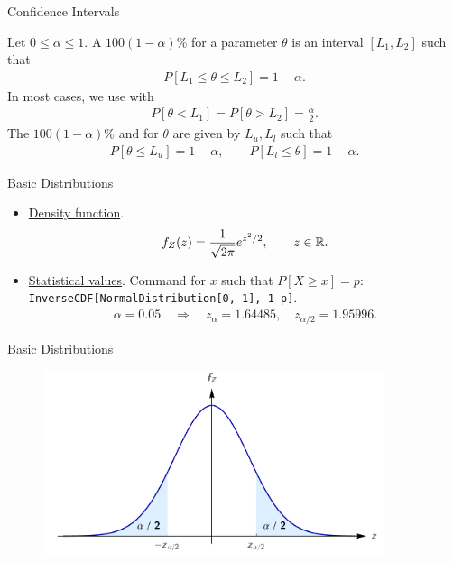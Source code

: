 \begin{frame}{Confidence Intervals}

\justifying
{} Let $0\leq \alpha \leq 1$. A $100(1-\alpha)\%$  for a parameter $\theta$ is an interval $[L_1, L_2]$ such that
\begin{align*}
P[L_1\leq \theta\leq L_2] = 1 - \alpha.
\end{align*}
In most cases, we use  with
\begin{align*}
P[\theta < L_1] = P[\theta > L_2] = \frac{\alpha}{2}.
\end{align*}
The $100(1-\alpha)\%$  and  for $\theta$ are given by $L_u, L_l$ such that
\begin{align*}
P[\theta \leq L_u] = 1 - \alpha, \qquad P[L_l \leq \theta] = 1 - \alpha.
\end{align*}

\end{frame}


\begin{frame}{Basic Distributions}

\begin{itemize}
	\justifying
	\item \underline{Density function}.
	\begin{align*}
	f_Z(z) = \frac{1}{\sqrt{2\pi}}e^{z^2/2}, \qquad z\in \mathbb{R}.
	\end{align*}
	\item \underline{Statistical values}. Command for $x$ such that $P[X\geq x] = p$: \\
	\texttt{InverseCDF[NormalDistribution[0, 1], 1-p]}.
	\begin{align*}
	\alpha = 0.05 \quad \Rightarrow \quad z_{\alpha} = 1.64485, \quad z_{\alpha/2} = 1.95996.
	\end{align*}
\end{itemize}

\end{frame}


\begin{frame}{Basic Distributions}

\begin{figure}[htbp]
	\centering
	\includegraphics[width=10cm]{./images/rc4fig3.png}
\end{figure}

\end{frame}


